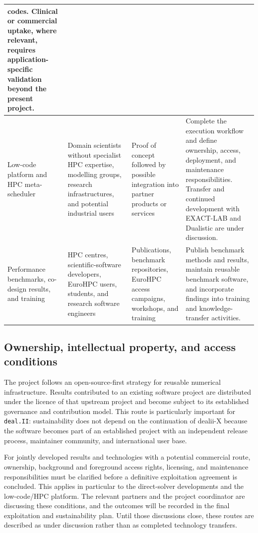 \documentclass[a4paper,12pt]{article}
\begin{document}
\begin{longtable}{|p{2.4cm}|p{2.9cm}|p{3.1cm}|p{4.2cm}|}
codes. Clinical or commercial uptake, where relevant, requires
application-specific validation beyond the present project. \\
\hline
Low-code platform and HPC meta-scheduler &
Domain scientists without specialist HPC expertise, modelling groups,
research infrastructures, and potential industrial users &
Proof of concept followed by possible integration into partner products or
services &
Complete the execution workflow and define ownership, access, deployment, and
maintenance responsibilities. Transfer and continued development with
EXACT-LAB and Dualistic are under discussion. \\
\hline
Performance benchmarks, co-design results, and training &
HPC centres, scientific-software developers, EuroHPC users, students, and
research software engineers &
Publications, benchmark repositories, EuroHPC access campaigns, workshops,
and training &
Publish benchmark methods and results, maintain reusable benchmark software,
and incorporate findings into training and knowledge-transfer activities. \\
\hline
\end{longtable}
\endgroup

\subsection{Ownership, intellectual property, and access conditions}

The project follows an open-source-first strategy for reusable numerical
infrastructure. Results contributed to an existing software project are
distributed under the licence of that upstream project and become subject to
its established governance and contribution model. This route is particularly
important for \texttt{deal.II}: sustainability does not depend on the
continuation of dealii-X because the software becomes part of an established
project with an independent release process, maintainer community, and
international user base.

For jointly developed results and technologies with a potential commercial
route, ownership, background and foreground access rights, licensing, and
maintenance responsibilities must be clarified before a definitive
exploitation agreement is concluded. This applies in particular to the
direct-solver developments and the low-code/HPC platform. The relevant
partners and the project coordinator are discussing these conditions, and
the outcomes will be recorded in the final exploitation and sustainability
plan. Until those discussions close, these routes are described as under
discussion rather than as completed technology transfers.
\end{document}

